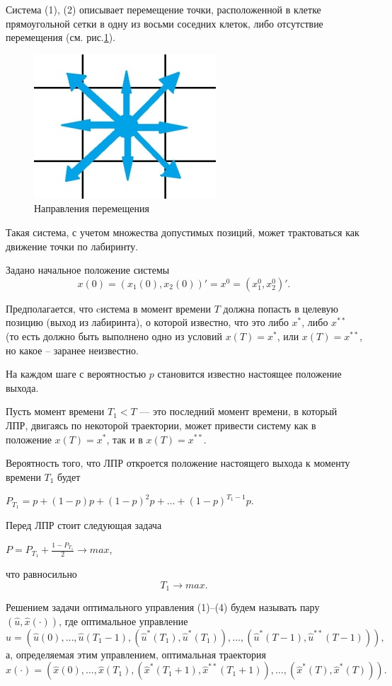 Система (1), (2) описывает перемещение точки, расположенной в клетке прямоугольной сетки в одну из восьми соседних клеток, либо отсутствие перемещения (см. рис.\ref{fig1}).
\begin{figure}[h]
\centering
\includegraphics[width=0.4\linewidth]{ris.jpg}
\caption{Направления перемещения}
\label{fig1}
\end{figure}
Такая система, с учетом множества допустимых позиций, может трактоваться как движение точки по лабиринту.

Задано начальное положение системы
\begin{equation} \label{eq3}
 x(0)=(x_1(0),x_2(0))'=x^0=(x_1^0,x_2^0)'.
\end{equation}

Предполагается, что cистема в момент времени $T$ должна попасть в целевую позицию (выход из лабиринта), о которой известно, что это либо $x^*$, либо $x^{**}$ (то есть должно быть выполнено одно из условий $x(T)=x^*$, или $x(T)=x^{**}$, но какое -- заранее неизвестно.

На каждом шаге с вероятностью $p$ становится известно настоящее положение выхода.

Пусть момент времени $T_1<T$ --- это последний момент времени, в который ЛПР, двигаясь по некоторой траектории, может привести систему как в положение $x(T)=x^*$, так и в $x(T)=x^{**}$.

Вероятность того, что ЛПР откроется положение настоящего выхода к моменту времени $T_1$ будет 
\begin{center}
$P_{T_1}=p+(1-p)p+{(1-p)^2}p+\ldots+{(1-p)^{{T_1}-1}p}$.
\end{center}
Перед ЛПР стоит следующая задача
\begin{center}
$P=P_{T_1}+\frac{1-P_{T_1}}{2}\rightarrow max$,
\end{center}
что равносильно 
\begin{equation} \label{eq4}
T_1 \rightarrow max .
\end{equation}


Решением задачи оптимального управления (1)--(4) будем называть пару $(\hat{u}, \hat{x}(\cdot))$, где
оптимальное управление
$$
\hat{u}=(\hat{u}(0),\ldots ,\hat{u}({{T}_{1}}-1),({{{\hat{u}}}^{*}}({{T}_{1}}),{{{\hat{u}}}^{*}}({{T}_{1}})),\ldots ,({{{\hat{u}}}^{*}}(T-1),{{{\hat{u}}}^{**}}(T-1))),
$$
а, определяемая этим управлением, оптимальная траектория
$$
\hat{x}(\cdot)=(\hat{x}(0),\ldots ,\hat{x}({{T}_{1}}),({{{\hat{x}}}^{*}}({{T}_{1}}+1),{{{\hat{x}}}^{**}}({{T}_{1}}+1)),\ldots ,({{{\hat{x}}}^{*}}(T),{{{\hat{x}}}^{*}}(T))).
$$

